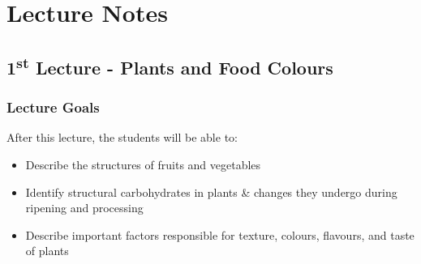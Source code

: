 \chapter{Lecture Notes}
\setlength{\headheight}{12.71342pt}
\addtolength{\topmargin}{-0.71342pt}

\section{1\texorpdfstring{\textsuperscript{st}}{st} Lecture - Plants and Food Colours}
\subsection*{Lecture Goals}
After this lecture, the students will be able to:
\begin{highlight}
    \begin{itemize}
    \item Describe the structures of fruits and vegetables
    
    \item Identify structural carbohydrates in plants \& changes they undergo during ripening and processing
    
    \item Describe important factors responsible for texture, colours, flavours, and taste of plants
    \end{itemize}
\end{highlight}

